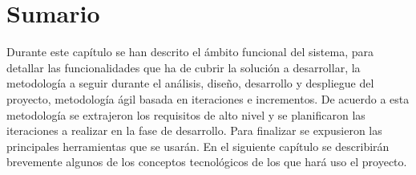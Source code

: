 \section{Sumario}

Durante este capítulo se han descrito el ámbito funcional del sistema, para detallar las funcionalidades que ha de cubrir la solución a desarrollar, la metodología a seguir durante el análisis, diseño, desarrollo y despliegue del proyecto, metodología ágil basada en iteraciones e incrementos. De acuerdo a esta metodología se extrajeron los requisitos de alto nivel y se planificaron las iteraciones a realizar en la fase de desarrollo. Para finalizar se expusieron las principales herramientas que se usarán. En el siguiente capítulo se describirán brevemente algunos de los conceptos tecnológicos de los que hará uso el proyecto. 